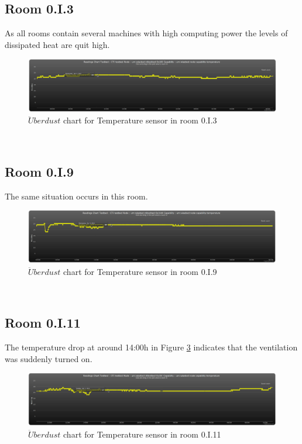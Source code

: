\documentclass[12pt,a4paper]{report}
\begin{document}
\subsection{Room 0.I.3}
%
As all rooms contain several machines with high computing power the levels of dissipated heat are quit high.
\begin{figure}[H]
\centering
	\includegraphics*[width=\textwidth]{temp_3}
	\caption{$\ddot{U}berdust$ chart for Temperature sensor in room 0.I.3}
	\label{chart_temp_3}
\end{figure}
\ \\
%
\subsection{Room 0.I.9}
%
The same situation occurs in this room.
\begin{figure}[H]
\centering
	\includegraphics*[width=\textwidth]{temp_9}
	\caption{$\ddot{U}berdust$ chart for Temperature sensor in room 0.I.9}
	\label{chart_temp_9}
\end{figure}
\ \\
%
\subsection{Room 0.I.11}
%
The temperature drop at around 14:00h in Figure \ref{chart_temp_11} indicates that the ventilation was suddenly turned on.
\begin{figure}[H]
\centering
	\includegraphics*[width=\textwidth]{temp_11}
	\caption{$\ddot{U}berdust$ chart for Temperature sensor in room 0.I.11}
	\label{chart_temp_11}
\end{figure}
\ \\
%
\end{document}
